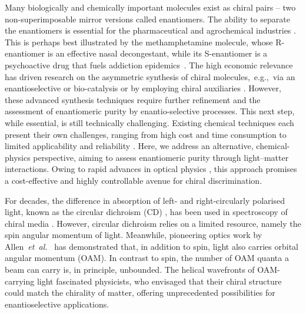 \documentclass[reprint,aps,prl,twocolumn,superscriptaddress,groupedaddress]{revtex4-2}
\begin{document}
Many biologically and chemically important molecules exist as chiral pairs -- two non-superimposable mirror versions called enantiomers. The ability to separate the enantiomers is essential for the pharmaceutical and agrochemical industries \cite{MAIER2001}. This is perhaps best illustrated by the methamphetamine molecule, whose R-enantiomer is an effective nasal decongestant, while its S-enantiomer is a psychoactive drug that fuels addiction epidemics~\cite{barkholtz2023}. The high economic relevance has driven research on the asymmetric synthesis of chiral molecules,~e.g.,~via an enantioselective or bio-catalysis or by employing chiral auxiliaries \cite{Brown1989}. However, these advanced synthesis techniques require further refinement and the assessment of enantiomeric purity by enantio-selective processes. This next step, while essential, is still technically challenging. Existing chemical techniques each present their own challenges, ranging from high cost and time consumption to limited applicability and reliability \cite{qian2023}. Here, we address an alternative, chemical-physics perspective, aiming to assess enantiomeric purity through light–matter interactions. Owing to rapid advances in optical physics \cite{Koch2019}, this approach promises a cost-effective and highly controllable avenue for chiral discrimination.

For decades, the difference in absorption of left- and right-circularly polarised light, known as the circular dichroism (CD) \cite{deutsche1970,Holzwarth1974}, has been used in spectroscopy of chiral media \cite{Miles2021}. However, circular dichroism relies on a limited resource, namely the spin angular momentum of light. Meanwhile, pioneering optics work by Allen~\textit{et~al.}~\cite{Allen1992} has demonstrated that, in addition to spin, light also carries orbital angular momentum (OAM). In contrast to spin, the number of OAM quanta a beam can carry is, in principle, unbounded. The helical wavefronts of OAM-carrying light fascinated physicists, who envisaged that their chiral structure could match the chirality of matter, offering unprecedented possibilities for enantioselective applications.
\end{document}

